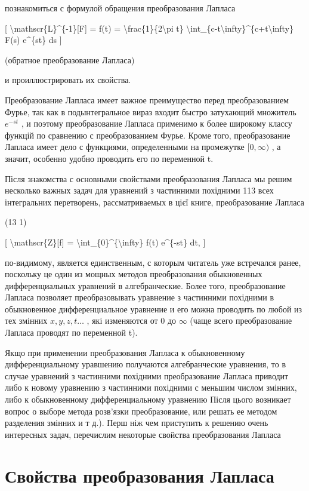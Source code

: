 \documentclass[
]{article}
\begin{document}
познакомиться с формулой обращения преобразования Лапласа

{[} \textbackslash mathscr\{L\}\^{}\{-1\}{[}F{]} = f(t) =
\textbackslash frac\{1\}\{2\textbackslash pi t\}
\textbackslash int\_\{c-t\textbackslash infty\}\^{}\{c+t\textbackslash infty\}
F(s) e\^{}\{st\} ds {]}

(обратное преобразование Лапласа)

и проиллюстрировать их свойства.

Преобразование Лапласа имеет важное преимущество перед преобразованием
Фурье, так как в подынтегральное вираз входит быстро затухающий
множитель \(e^{-st}\) , и поэтому преобразование Лапласа применимо к
более широкому классу функцій по сравнению с преобразованием Фурье.
Кроме того, преобразование Лапласа имеет дело с функциями, определенными
на промежутке \([0, \infty)\) , а значит, особенно удобно проводить его
по переменной t.

Після знакомства с основными свойствами преобразования Лапласа мы решим
несколько важных задач для уравнений з частинними похідними 113 всех
інтегральних перетворень, рассматриваемых в цієї книге, преобразование
Лапласа

(13 1)

{[} \textbackslash mathscr\{Z\}{[}f{]} =
\textbackslash int\_\{0\}\^{}\{\textbackslash infty\} f(t) e\^{}\{-st\}
dt, {]}

по-видимому, является единственным, с которым читатель уже встречался
ранее, поскольку це один из мощных методов преобразования обыкновенных
дифференциальных уравнений в алгебранческие. Более того, преобразование
Лапласа позволяет преобразовывать уравнение з частинними похідними в
обыкновенное дифференциальное уравнение и его можна проводить по любой
из тех змінних \(x, y, z, t \ldots\) , які изменяются от 0 до \(\infty\)
(чаще всего преобразование Лапласа проводят по переменной t).

Якщо при применении преобразования Лапласа к обыкновенному
дифференциальному уравшению получаются алгебранческие уравнения, то в
случае уравнений з частинними похідними преобразование Лапласа приводит
либо к новому уравнению з частинними похідними с меньшим числом змінних,
либо к обыкновенному дифференциальному уравнению Після цього возникает
вопрос о выборе метода розв'язки преобразование, или решать ее методом
разделения змінних и т д.). Перш ніж чем приступить к решению очень
интересных задач, перечислим некоторые свойства преобразования Лапласа

\section{Свойства преобразования
Лапласа}\label{ux441ux432ux43eux439ux441ux442ux432ux430-ux43fux440ux435ux43eux431ux440ux430ux437ux43eux432ux430ux43dux438ux44f-ux43bux430ux43fux43bux430ux441ux430}
\end{document}
